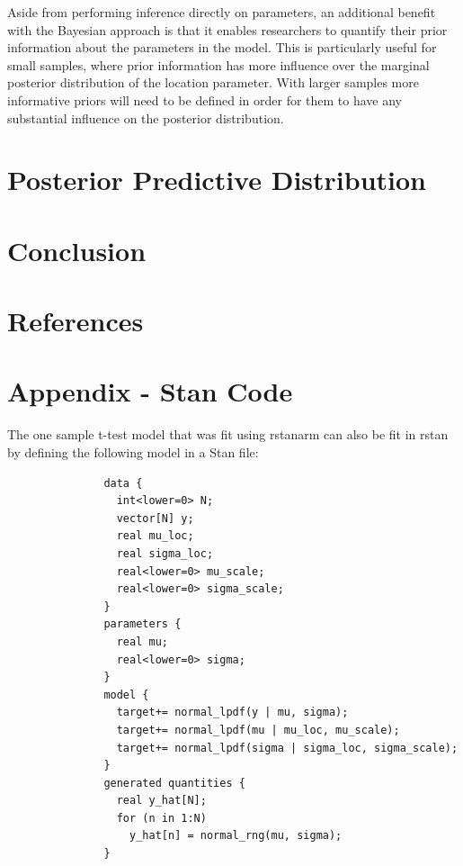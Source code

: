 \documentclass[12pt]{article}
\begin{document}
\noindent Aside from performing inference directly on parameters, an additional benefit with the Bayesian approach is that it enables researchers to quantify their prior information about the parameters in the model. This is particularly useful for small samples, where prior information has more influence over the marginal posterior distribution of the location parameter. With larger samples more informative priors will need to be defined in order for them to have any substantial influence on the posterior distribution.

\section{Posterior Predictive Distribution}

\section{Conclusion}


\pagebreak

\section{References}


\pagebreak

\section{Appendix - Stan Code}

\noindent The one sample t-test model that was fit using rstanarm can also be fit in rstan by defining the following model in a Stan file:

\begin{verbatim}
               data {
                 int<lower=0> N;
                 vector[N] y;
                 real mu_loc;
                 real sigma_loc;
                 real<lower=0> mu_scale;
                 real<lower=0> sigma_scale;
               }
               parameters {
                 real mu;
                 real<lower=0> sigma;
               }
               model {
                 target+= normal_lpdf(y | mu, sigma);
                 target+= normal_lpdf(mu | mu_loc, mu_scale);
                 target+= normal_lpdf(sigma | sigma_loc, sigma_scale);
               }
               generated quantities {
                 real y_hat[N];
                 for (n in 1:N)
                   y_hat[n] = normal_rng(mu, sigma);
               }

\end{verbatim}
\end{document}
